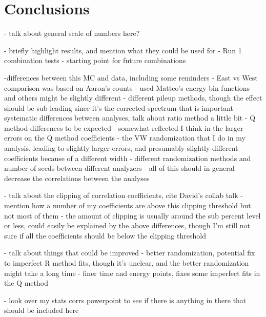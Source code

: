
\graphicspath{{Body/Figures/}}

\clearpage
\section{Conclusions}

- talk about general scale of numbers here?

- briefly highlight results, and mention what they could be used for
	- Run 1 combination tests
	- starting point for future combinations

	


-differences between this MC and data, including some reminders
 - East vs West comparison was based on Aaron's counts
 - used Matteo's energy bin functions and others might be slightly different
 - different pileup methods, though the effect should be sub leading since it's the corrected spectrum that is important
 - systematic differences between analyses, talk about ratio method a little bit
 - Q method differences to be expected - somewhat reflected I think in the larger errors on the Q method coefficients
 - the VW randomization that I do in my analysis, leading to slightly larger errors, and presumably slightly different coefficients because of a different width
 - different randomization methods and number of seeds between different analyzers
- all of this should in general decrease the correlations between the analyses

- talk about the clipping of correlation coefficients, cite David's collab talk
	- mention how a number of my coefficients are above this clipping threshold but not most of them
	- the amount of clipping is usually around the sub percent level or less, could easily be explained by the above differences, though I'm still not sure if all the coefficients should be below the clipping threshold


- talk about things that could be improved
	- better randomization, potential fix to imperfect R method fits, though it's unclear, and the better randomization might take a long time
	- finer time and energy points, fixes some imperfect fits in the Q method


- look over my stats corrs powerpoint to see if there is anything in there that should be included here


